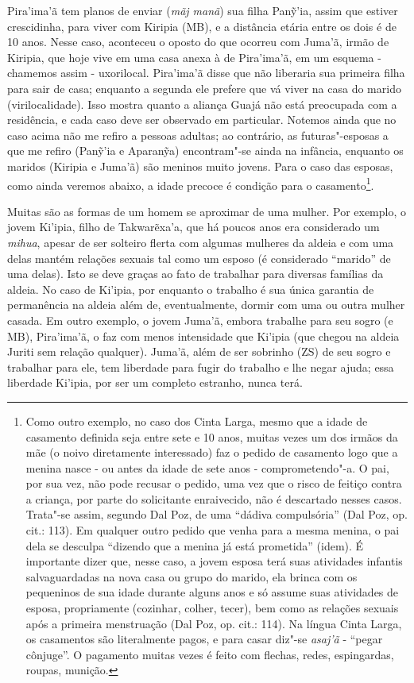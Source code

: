 Pira'ima'ã tem planos de enviar (\emph{mãj manã}) sua filha Panỹ'ia,
assim que estiver crescidinha, para viver com Kiripia (MB), e a
distância etária entre os dois é de 10 anos. Nesse caso, aconteceu o
oposto do que ocorreu com Juma'ã, irmão de Kiripia, que hoje vive em uma
casa anexa à de Pira'ima'ã, em um esquema - chamemos assim - uxorilocal.
Pira'ima'ã disse que não liberaria sua primeira filha para sair de casa;
enquanto a segunda ele prefere que vá viver na casa do marido
(virilocalidade). Isso mostra quanto a aliança Guajá não está preocupada
com a residência, e cada caso deve ser observado em particular. Notemos
ainda que no caso acima não me refiro a pessoas adultas; ao contrário,
as futuras"-esposas a que me refiro (Panỹ'ia e Aparanỹa) encontram"-se
ainda na infância, enquanto os maridos (Kiripia e Juma'ã) são meninos
muito jovens. Para o caso das esposas, como ainda veremos abaixo, a
idade precoce é condição para o casamento\footnote{Como outro exemplo,
  no caso dos Cinta Larga, mesmo que a idade de casamento definida seja
  entre sete e 10 anos, muitas vezes um dos irmãos da mãe (o noivo
  diretamente interessado) faz o pedido de casamento logo que a menina
  nasce - ou antes da idade de sete anos - comprometendo"-a. O pai, por
  sua vez, não pode recusar o pedido, uma vez que o risco de feitiço
  contra a criança, por parte do solicitante enraivecido, não é
  descartado nesses casos. Trata"-se assim, segundo Dal Poz, de uma
  ``dádiva compulsória'' (Dal Poz, op. cit.: 113). Em qualquer outro
  pedido que venha para a mesma menina, o pai dela se desculpa ``dizendo
  que a menina já está prometida'' (idem). É importante dizer que, nesse
  caso, a jovem esposa terá suas atividades infantis salvaguardadas na
  nova casa ou grupo do marido, ela brinca com os pequeninos de sua
  idade durante alguns anos e só assume suas atividades de esposa,
  propriamente (cozinhar, colher, tecer), bem como as relações sexuais
  após a primeira menstruação (Dal Poz, op. cit.: 114). Na língua Cinta
  Larga, os casamentos são literalmente pagos, e para casar diz"-se
  \emph{asaj'ã} - ``pegar cônjuge''. O pagamento muitas vezes é feito
  com flechas, redes, espingardas, roupas, munição.}.

Muitas são as formas de um homem se aproximar de uma mulher. Por
exemplo, o jovem Ki'ipia, filho de Takwarẽxa'a, que há poucos anos era
considerado um \emph{mihua}, apesar de ser solteiro flerta com algumas
mulheres da aldeia e com uma delas mantém relações sexuais tal como um
esposo (é considerado ``marido'' de uma delas). Isto se deve graças ao
fato de trabalhar para diversas famílias da aldeia. No caso de Ki'ipia,
por enquanto o trabalho é sua única garantia de permanência na aldeia
além de, eventualmente, dormir com uma ou outra mulher casada. Em outro
exemplo, o jovem Juma'ã, embora trabalhe para seu sogro (e MB),
Pira'ima'ã, o faz com menos intensidade que Ki'ipia (que chegou na
aldeia Juriti sem relação qualquer). Juma'ã, além de ser sobrinho (ZS)
de seu sogro e trabalhar para ele, tem liberdade para fugir do trabalho
e lhe negar ajuda; essa liberdade Ki'ipia, por ser um completo estranho,
nunca terá.

